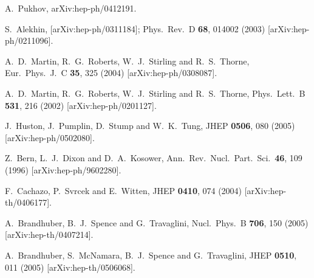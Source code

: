 \documentclass[12pt]{iopart}
\begin{document}
\begin{thebibliography}{99}
  A.~Pukhov,
  arXiv:hep-ph/0412191.


S.~Alekhin,
[arXiv:hep-ph/0311184];
Phys.\ Rev.\ D {\bf 68}, 014002 (2003)
[arXiv:hep-ph/0211096].

A.~D.~Martin, R.~G.~Roberts, W.~J.~Stirling and R.~S.~Thorne,
Eur.\ Phys.\ J.\ C {\bf 35}, 325 (2004)
[arXiv:hep-ph/0308087].

A.~D.~Martin, R.~G.~Roberts, W.~J.~Stirling and R.~S.~Thorne,
Phys.\ Lett.\ B {\bf 531}, 216 (2002)
[arXiv:hep-ph/0201127].

  J.~Huston, J.~Pumplin, D.~Stump and W.~K.~Tung,
  JHEP {\bf 0506}, 080 (2005)
  [arXiv:hep-ph/0502080].

  Z.~Bern, L.~J.~Dixon and D.~A.~Kosower,
  Ann.\ Rev.\ Nucl.\ Part.\ Sci.\  {\bf 46}, 109 (1996)
  [arXiv:hep-ph/9602280].


  F.~Cachazo, P.~Svrcek and E.~Witten,
  JHEP {\bf 0410}, 074 (2004)
  [arXiv:hep-th/0406177].

  A.~Brandhuber, B.~J.~Spence and G.~Travaglini,
  Nucl.\ Phys.\ B {\bf 706}, 150 (2005)
  [arXiv:hep-th/0407214].

  A.~Brandhuber, S.~McNamara, B.~J.~Spence and G.~Travaglini,
  JHEP {\bf 0510}, 011 (2005)
  [arXiv:hep-th/0506068].


\end{thebibliography}
\end{document}
